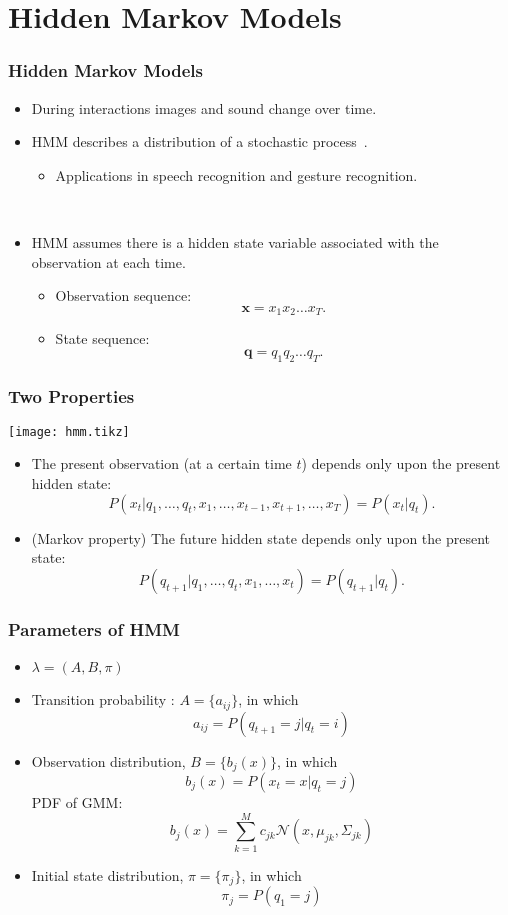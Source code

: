 \documentclass{beamer}
\begin{document}
\section{Hidden Markov Models}
\begin{frame}
  \frametitle{Hidden Markov Models}

  \begin{itemize}
    \item During interactions images and sound change over time.
    \item HMM describes a distribution of a stochastic process~\cite{rabiner_fundamentals_1993}.
      \begin{itemize}
        \item Applications in speech recognition and gesture recognition. 
      \end{itemize}
      ~

    \item HMM assumes there is a hidden state variable associated with the observation at each time.
      \begin{itemize}
        \item Observation sequence: \[ \mathbf{x} = x_1 x_2 \dots x_T . \]
        \item State sequence: \[ \mathbf{q} = q_1 q_2 \dots q_T . \]
      \end{itemize}
  \end{itemize}
\end{frame}

\begin{frame}
  \frametitle{Two Properties}

  \centering
  \texttt{[image: hmm.tikz]}

  \begin{itemize}
    \item The present observation (at a certain time $t$) depends only upon the present hidden state:
      \[
        P(x_t|q_1, \dots, q_t, x_1, \dots, x_{t-1},x_{t+1},\dots,x_T) = P(x_t|q_t) .
      \]
    \item (Markov property) The future hidden state depends only upon the present state:
      \[
        P(q_{t+1}|q_1, \dots, q_t, x_1, \dots, x_t) = P(q_{t+1}|q_t) .
      \]
  \end{itemize}
\end{frame}

\begin{frame}
  \frametitle{Parameters of HMM}

  \begin{itemize}
    \item $ \lambda = (A, B, \pi) $
    \item Transition probability : $A = \{a_{ij}\}$, in which 
      \[ a_{ij} = P(q_{t+1} = j | q_t = i) \]
    \item Observation distribution, $B = \{b_j(x)\}$, in which
      \[ b_j(x) = P(x_t = x | q_t = j) \]
      PDF of GMM:
      \[ b_j(x) = \sum_{k=1}^M c_{jk} \mathcal{N}(x, \mu_{jk}, \Sigma_{jk}) \]
    \item Initial state distribution, $\pi = \{\pi_j\}$, in which
      \[ \pi_j = P(q_1 = j) \]
  \end{itemize}
\end{frame}
\end{document}
